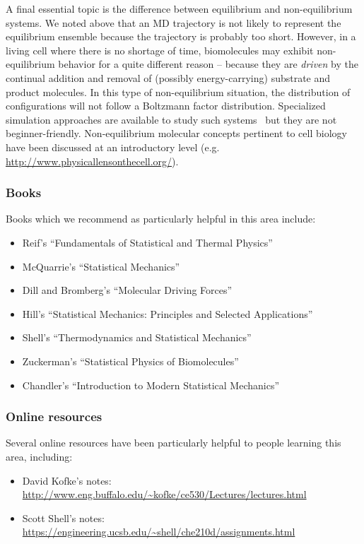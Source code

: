 \documentclass[9pt,bestpractices]{livecoms}
\begin{document}
A final essential topic is the difference between equilibrium and non-equilibrium systems.  
We noted above that an MD trajectory is not likely to represent the equilibrium ensemble because the trajectory is probably too short.  
However, in a living cell where there is no shortage of time, biomolecules may exhibit non-equilibrium behavior for a quite different reason -- because they are \emph{driven} by the continual addition and removal of (possibly energy-carrying) substrate and product molecules.  
In this type of non-equilibrium situation, the distribution of configurations will not follow a Boltzmann factor distribution.  
Specialized simulation approaches are available to study such systems~\cite{Chong:2017:CurrentOpinioninStructuralBiology,  Zuckerman:2017:AnnuRevBiophys} but they are not beginner-friendly.  
Non-equilibrium molecular concepts pertinent to cell biology have been discussed at an introductory level (e.g. \url{http://www.physicallensonthecell.org/}).


\subsubsection{Books}

Books which we recommend as particularly helpful in this area include:
\begin{itemize}
\item Reif's ``Fundamentals of Statistical and Thermal Physics''~\cite{Reif:2009:}
\item McQuarrie's ``Statistical Mechanics''~\cite{McQuarrie:2000:}
\item Dill and Bromberg's ``Molecular Driving Forces''~\cite{DillBook}
\item Hill's ``Statistical Mechanics: Principles and Selected Applications''~\cite{Hill:1987:}
\item Shell's ``Thermodynamics and Statistical Mechanics''~\cite{ShellBook}
\item Zuckerman's ``Statistical Physics of Biomolecules''~\cite{Zuckerman:2010:}
\item Chandler's ``Introduction to Modern Statistical Mechanics''~\cite{Chandler:1987:}
\end{itemize}

\subsubsection{Online resources}

Several online resources have been particularly helpful to people learning this area, including:
\begin{itemize}
\item David Kofke's notes: \url{http://www.eng.buffalo.edu/~kofke/ce530/Lectures/lectures.html}
\item Scott Shell's notes: \url{https://engineering.ucsb.edu/~shell/che210d/assignments.html}
\end{itemize}
\end{document}
